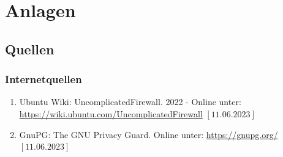 \documentclass[a4paper, 11pt]{scrartcl}
\begin{document}
\newpage
\section{Anlagen}
\subsection{Quellen}\label{ch:src}
\subsubsection{Internetquellen}\label{ch:src_internet}
\begin{enumerate}
    \item Ubuntu Wiki: UncomplicatedFirewall. 2022 - Online unter: \newline\url{https://wiki.ubuntu.com/UncomplicatedFirewall} $\left[\text{11.06.2023}\right]$\label{src:ufw}
    \item GnuPG: The GNU Privacy Guard. Online unter: \newline\url{https://gnupg.org/} $\left[\text{11.06.2023}\right]$\label{src:gnupg}
\end{enumerate}
\begin{small}

\end{small}
\end{document}
